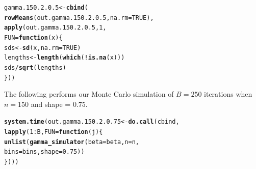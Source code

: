 \documentclass[11pt]{article}\usepackage[]{graphicx}\usepackage[]{color}
\makeatletter
\newcommand{\hlnum}[1]{\textcolor[rgb]{0.686,0.059,0.569}{#1}}%
\newcommand{\hlopt}[1]{\textcolor[rgb]{0,0,0}{#1}}%
\newcommand{\hlstd}[1]{\textcolor[rgb]{0.345,0.345,0.345}{#1}}%
\newcommand{\hlkwa}[1]{\textcolor[rgb]{0.161,0.373,0.58}{\textbf{#1}}}%
\newcommand{\hlkwb}[1]{\textcolor[rgb]{0.69,0.353,0.396}{#1}}%
\newcommand{\hlkwc}[1]{\textcolor[rgb]{0.333,0.667,0.333}{#1}}%
\newcommand{\hlkwd}[1]{\textcolor[rgb]{0.737,0.353,0.396}{\textbf{#1}}}%
\newenvironment{kframe}{%
 \def\at@end@of@kframe{}%
 \ifinner\ifhmode%
  \def\at@end@of@kframe{\end{minipage}}%
  \begin{minipage}{\columnwidth}%
 \fi\fi%
 \def\FrameCommand##1{\hskip\@totalleftmargin \hskip-\fboxsep
 \colorbox{shadecolor}{##1}\hskip-\fboxsep
     \hskip-\linewidth \hskip-\@totalleftmargin \hskip\columnwidth}%
 \MakeFramed {\advance\hsize-\width
   \@totalleftmargin\z@ \linewidth\hsize
   \@setminipage}}%
 {\par\unskip\endMakeFramed%
 \at@end@of@kframe}
\newenvironment{knitrout}{}{} %
\makeatother
\begin{document}
\begin{knitrout}
\color{fgcolor}\begin{kframe}
\begin{alltt}
\hlstd{gamma.150.2.0.5} \hlkwb{<-} \hlkwd{cbind}\hlstd{(}
  \hlkwd{rowMeans}\hlstd{(out.gamma.150.2.0.5,} \hlkwc{na.rm} \hlstd{=} \hlnum{TRUE}\hlstd{),}
  \hlkwd{apply}\hlstd{(out.gamma.150.2.0.5,} \hlnum{1}\hlstd{,}
  \hlkwc{FUN} \hlstd{=} \hlkwa{function}\hlstd{(}\hlkwc{x}\hlstd{)\{}
    \hlstd{sds} \hlkwb{<-} \hlkwd{sd}\hlstd{(x,} \hlkwc{na.rm} \hlstd{=} \hlnum{TRUE}\hlstd{)}
    \hlstd{lengths} \hlkwb{<-} \hlkwd{length}\hlstd{(}\hlkwd{which}\hlstd{(}\hlopt{!}\hlkwd{is.na}\hlstd{(x)))}
    \hlstd{sds} \hlopt{/} \hlkwd{sqrt}\hlstd{(lengths)}
  \hlstd{\}))}
\end{alltt}


{\ttfamily\noindent\bfseries\color{errorcolor}{\#\# Error in is.data.frame(x): object 'out.gamma.150.2.0.5' not found}}\end{kframe}
\end{knitrout}

The following performs our Monte Carlo simulation of $B = 250$ iterations 
when $n = 150$ and shape = $0.75$.

\begin{knitrout}
\color{fgcolor}\begin{kframe}
\begin{alltt}
\hlkwd{system.time}\hlstd{(out.gamma.150.2.0.75} \hlkwb{<-} \hlkwd{do.call}\hlstd{(cbind,}
  \hlkwd{lapply}\hlstd{(}\hlnum{1}\hlopt{:}\hlstd{B,} \hlkwc{FUN} \hlstd{=} \hlkwa{function}\hlstd{(}\hlkwc{j}\hlstd{)\{}
    \hlkwd{unlist}\hlstd{(}\hlkwd{gamma_simulator}\hlstd{(}\hlkwc{beta} \hlstd{= beta,} \hlkwc{n} \hlstd{= n,}
      \hlkwc{bins} \hlstd{= bins,} \hlkwc{shape} \hlstd{=} \hlnum{0.75}\hlstd{))}
\hlstd{\})))}
\end{alltt}


{\ttfamily\noindent\bfseries\color{errorcolor}{\#\# Error in eval(predvars, data, env): object 'x1' not found}}

{\ttfamily\noindent\itshape\color{messagecolor}{\#\# Timing stopped at: 0.002 0 0.002}}\end{kframe}
\end{knitrout}
\end{document}
